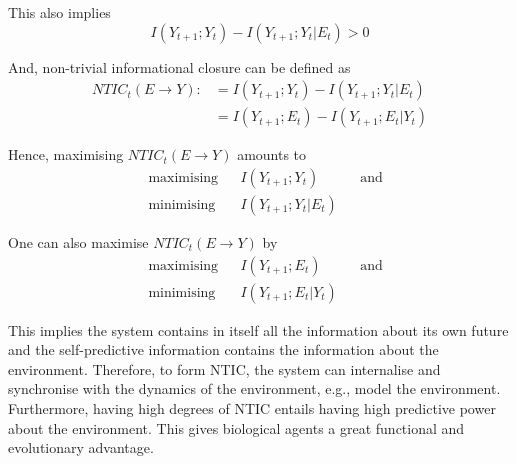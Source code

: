 \documentclass[utf8]{article}
\begin{document}
			\noindent
			This also implies
				\begin{equation}
					I(Y_{t+1};Y_{t})-I(Y_{t+1};Y_{t}|E_{t}) > 0
				\end{equation}



			\noindent
			And, non-trivial informational closure can be defined as
				\begin{align}
    				NTIC_t(E\rightarrow Y) :&=I(Y_{t+1};Y_{t})-I(Y_{t+1};Y_{t}|E_{t}) 
    				\label{eq:NTIC1}\\
    				&=I(Y_{t+1};E_{t})-I(Y_{t+1};E_{t}|Y_{t}) 
    				\label{eq:NTIC2}
				\end{align}
			

			\noindent
			Hence, maximising $NTIC_t(E\rightarrow Y)$ amounts to
				\begin{equation}
    				\label{eq:nticObjective}
    				\begin{aligned}
    				& \text{maximising} & { } & I(Y_{t+1};Y_{t}) & { } & \text{and} \\
    				& \text{minimising} & { } & I(Y_{t+1};Y_{t}|E_{t}) & { }
    				\end{aligned}
				\end{equation}
			
			\noindent
			One can also maximise $NTIC_t(E\rightarrow Y)$ by 
				\begin{equation}
    				\label{eq:nticObjective2}
    				\begin{aligned}
    				& \text{maximising} & { } & I(Y_{t+1};E_{t}) & { } & \text{and} \\
    				& \text{minimising} & { } & I(Y_{t+1};E_{t}|Y_{t}) & { }
    				\end{aligned}
				\end{equation}			

			\noindent
			This implies the system contains in itself all the information about its own future and the self-predictive information contains the information about the environment. Therefore, to form NTIC, the system can internalise and synchronise with the dynamics of the environment, e.g., model the environment. Furthermore, having high degrees of NTIC entails having high predictive power about the environment. This gives biological agents a great functional and evolutionary advantage. 
			

\end{document}
